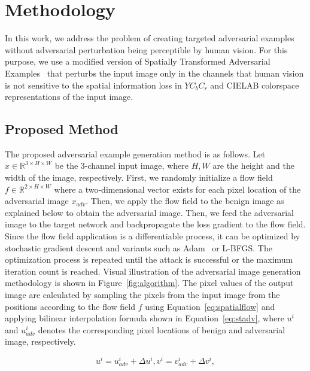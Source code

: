 \chapter{Methodology}
\label{chp:3_methodology}
In this work, we address the problem of creating targeted adversarial examples without adversarial perturbation being perceptible by human vision. For this purpose, we use a modified version of Spatially Transformed Adversarial Examples~\cite{xiao2018spatially} that perturbs the input image only in the channels that human vision is not sensitive to the spatial information loss in \(YC_{b}C_{r}\) and CIELAB colorspace representations of the input image.

\section{Proposed Method}

The proposed adversarial example generation method is as follows. Let \(x \in \mathbb{R}^{3\times H \times W}\) be the 3-channel input image, where \(H, W\) are the height and the width of the image, respectively. First, we randomly initialize a flow field \(f \in \mathbb{R}^{2\times H \times W}\) where a two-dimensional vector exists for each pixel location of the adversarial image \(x_{adv}\). Then, we apply the flow field to the benign image as explained below to obtain the adversarial image. Then, we feed the adversarial image to the target network and backpropagate the loss gradient to the flow field. Since the flow field application is a differentiable process, it can be optimized by stochastic gradient descent and variants such as Adam~\cite{kingma2015adam} or L-BFGS\cite{liu1989limited}. The optimization process is repeated until the attack is successful or the maximum iteration count is reached. Visual illustration of the adversarial image generation methodology is shown in Figure~\ref{fig:algorithm}. The pixel values of the output image are calculated by sampling the pixels from the input image from the positions according to the flow field \(f\) using Equation~\ref{eq:spatialflow} and applying bilinear interpolation formula shown in Equation~\ref{eq:stadv}, where \(u^{i}\) and \(u_{adv}^{i}\) denotes the corresponding pixel locations of benign and adversarial image, respectively.

\begin{equation}
    \label{eq:spatialflow}
    u^i = u_{adv}^i + \Delta u^i, 
    v^i = v_{adv}^i + \Delta v^i, 
\end{equation}


